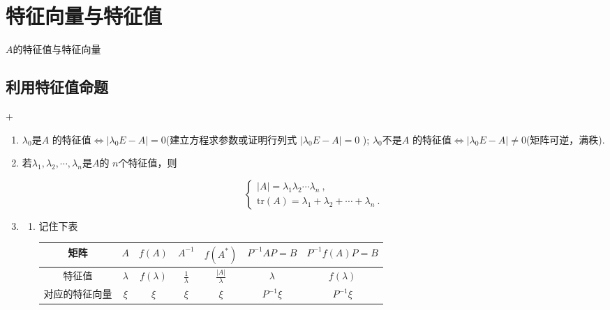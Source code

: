 \chapter{特征向量与特征值}
 $A$的特征值与特征向量

\section{利用特征值命题}
\DOne +\DTwoTwo
\begin{enumerate}
    \item $\lambda_0$是$A$ 的特征值$\Leftrightarrow|\lambda_0E-A|=0$(建立方程求参数或证明行列式 $|\lambda_0E-A|=0$ );
          $\lambda_0$不是$A$ 的特征值$\Leftrightarrow|\lambda_0E-A|\neq0$(矩阵可逆，满秩).
    \item 若$\lambda_1,\lambda_2,\cdots,\lambda_n$是$A$的 $n$个特征值，则

          $$\begin{cases}|A|=\lambda_1\lambda_2\cdots\lambda_n\:,\\\mathrm{tr}\left(A\right)=\lambda_1+\lambda_2+\cdots+\lambda_n\:.\end{cases}$$
    \item \begin{enumerate}
              \item 记住下表
                    \begin{table}[h]
                        \centering
                        \begin{tabular}{|c|c|c|c|c|c|c|}
                            \hline
                            矩阵      & $A$       & $f(A)$       & $A^{-1}$            & $f(A^*)$               & $P^{-1}AP=B$ & $P^{-1}f(A)P=B$ \\
                            \hline
                            特征值     & $\lambda$ & $f(\lambda)$ & $\frac{1}{\lambda}$ & $\frac{|A|}{\lambda} $ & $\lambda$    & $f(\lambda)$    \\
                            \hline
                            对应的特征向量 & $\xi$     & $\xi$        & $\xi$               & $\xi$                  & $P^{-1}\xi$  & $P^{-1}\xi$     \\
                            \hline
                        \end{tabular}
                    \end{table}


\end{enumerate}
\end{enumerate}
